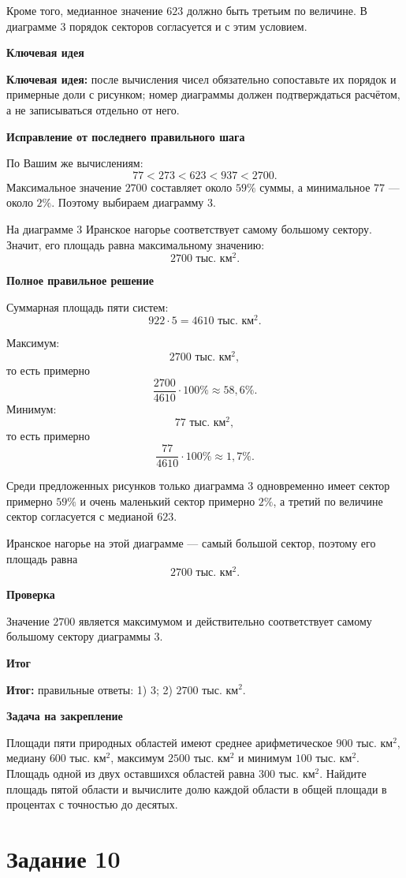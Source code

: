\documentclass[12pt,a4paper]{article}
\newcommand{\keyidea}{\textcolor{blue!60!black}{\textbf{Ключевая идея:}}}
\newcommand{\resultlabel}{\textcolor{teal!60!black}{\textbf{Итог:}}}
\newcommand{\subhead}[1]{\par\medskip\textbf{#1}\par}
\begin{document}
Кроме того, медианное значение $623$ должно быть третьим по величине. В диаграмме 3 порядок секторов согласуется и с этим условием.

\subhead{Ключевая идея}
\keyidea{} после вычисления чисел обязательно сопоставьте их порядок и примерные доли с рисунком; номер диаграммы должен подтверждаться расчётом, а не записываться отдельно от него.

\subhead{Исправление от последнего правильного шага}
По Вашим же вычислениям:
\[
77<273<623<937<2700.
\]
Максимальное значение $2700$ составляет около $59\%$ суммы, а минимальное $77$ --- около $2\%$. Поэтому выбираем диаграмму 3.

На диаграмме 3 Иранское нагорье соответствует самому большому сектору. Значит, его площадь равна максимальному значению:
\[
2700\text{ тыс. км}^2.
\]

\subhead{Полное правильное решение}
Суммарная площадь пяти систем:
\[
922\cdot5=4610\text{ тыс. км}^2.
\]

Максимум:
\[
2700\text{ тыс. км}^2,
\]
то есть примерно
\[
\frac{2700}{4610}\cdot100\%\approx58{,}6\%.
\]
Минимум:
\[
77\text{ тыс. км}^2,
\]
то есть примерно
\[
\frac{77}{4610}\cdot100\%\approx1{,}7\%.
\]

Среди предложенных рисунков только диаграмма 3 одновременно имеет сектор примерно $59\%$ и очень маленький сектор примерно $2\%$, а третий по величине сектор согласуется с медианой $623$.

Иранское нагорье на этой диаграмме --- самый большой сектор, поэтому его площадь равна
\[
2700\text{ тыс. км}^2.
\]

\subhead{Проверка}
Значение $2700$ является максимумом и действительно соответствует самому большому сектору диаграммы 3.

\subhead{Итог}
\resultlabel{} правильные ответы: 1) 3; 2) $2700$ тыс. км$^2$.

\subhead{Задача на закрепление}
Площади пяти природных областей имеют среднее арифметическое $900$ тыс. км$^2$, медиану $600$ тыс. км$^2$, максимум $2500$ тыс. км$^2$ и минимум $100$ тыс. км$^2$. Площадь одной из двух оставшихся областей равна $300$ тыс. км$^2$. Найдите площадь пятой области и вычислите долю каждой области в общей площади в процентах с точностью до десятых.

\newpage
{}\label{task:10}
\section*{Задание 10}
\end{document}
